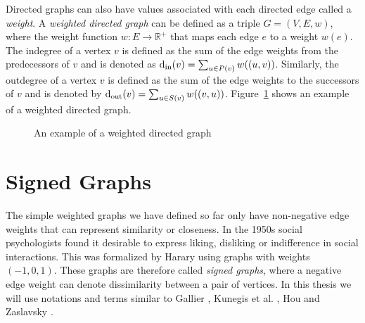 Directed graphs can also have values associated with each directed edge called a \textit{weight}. A \textit{weighted directed graph} can be defined as a triple $G=(V,E,w)$, where the weight function $w:E \rightarrow \mathbb{R}^{+}$ that maps each edge $e$ to a weight $w(e)$. The indegree of a vertex $v$ is defined as the sum of the edge weights from the predecessors of $v$ and is denoted as $\operatorname*{d_{\text{in}}}(v) = \sum_{u \in P(v)} w((u,v))$. Similarly, the outdegree of a vertex $v$ is defined as the sum of the edge weights to the successors of $v$ and is denoted by $\operatorname*{d_{\text{out}}}(v) = \sum_{u \in S(v)}w((v,u))$.
Figure~\ref{fig:weighted-directed} shows an example of a weighted directed graph.

\begin{figure}[!ht]
    \centering
    
    \caption{An example of a weighted directed graph}
    \label{fig:weighted-directed}
\end{figure}

\section{Signed Graphs}
\label{sec:signed-graphs}
The simple weighted graphs we have defined so far only have non-negative edge weights that can represent similarity or closeness. In the 1950s social psychologists found it desirable to express liking, disliking or indifference in social interactions. This was formalized by Harary \cite{harary1953on} using graphs with weights $(-1,0,1)$. These graphs are therefore called \textit{signed graphs}, where a negative edge weight can denote dissimilarity between a pair of vertices. In this thesis we will use notations and terms similar to Gallier \cite{gallier2016spectral}, Kunegis et al. \cite{kunegis2010spectral}, Hou \cite{hou2005bounds} and Zaslavsky \cite{zaslavsky1982signed}.

